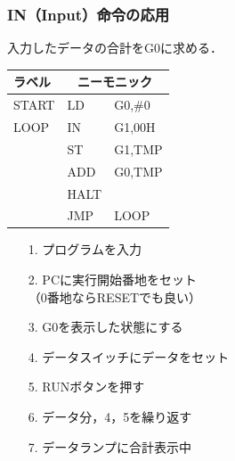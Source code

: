 \documentclass[handout]{beamer}        %
\begin{document}
\begin{frame}
  \frametitle{IN（Input）命令の応用}
  入力したデータの合計をG0に求める．
  \vfill
  \begin{minipage}{0.43\columnwidth}
    {\ttfamily\small\begin{center}
      \begin{tabular}{|l|l l|}
        \hline
        ラベル & \multicolumn{2}{|c|}{ニーモニック} \\
        \hline
        START & LD   & G0,\#0        \\
        LOOP  & IN   & G1,00H        \\
              & ST   & G1,TMP        \\
              & ADD  & G0,TMP        \\
              & HALT &               \\
              & JMP  & LOOP          \\
        \hline
      \end{tabular}
    \end{center}}
  \end{minipage}
  \begin{minipage}{0.53\columnwidth}
    \begin{enumerate}
    \item[1.] プログラムを入力
    \item[2.] PCに実行開始番地をセット \\
      （0番地ならRESETでも良い）
    \item[3.] G0を表示した状態にする
    \item[4.] データスイッチにデータをセット
    \item[5.] RUNボタンを押す
    \item[6.] データ分，4，5を繰り返す
    \item[7.] データランプに合計表示中
    \end{enumerate}
  \end{minipage}
  \vfill
\end{frame}
\end{document}

